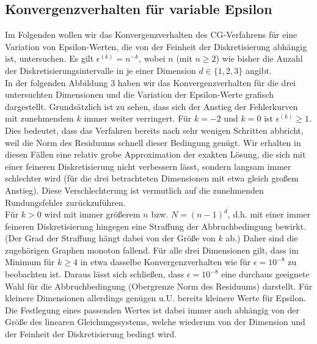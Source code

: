 \documentclass{scrartcl}
\begin{document}
\subsection{Konvergenzverhalten für variable Epsilon}
Im Folgenden wollen wir das Konvergenzverhalten des CG-Verfahrens für eine Variation von Epsilon-Werten, die von der Feinheit der Diskretisierung abhängig ist, untersuchen.
Es gilt $\epsilon^{(k)}=n^{-k}$, wobei $n$ (mit $n \geq 2$) wie bisher die Anzahl der Diskretisierungsintervalle in je einer Dimension $d\in\{1, 2, 3\}$ angibt. \\
In der folgenden Abbildung 3 haben wir das Konvergenzverhalten für die drei untersuchten Dimensionen und die Variation der Epsilon-Werte grafisch dargestellt.
Grundsätzlich ist zu sehen, dass sich der Anstieg der Fehlerkurven mit zunehmendem $k$ immer weiter verringert.
Für $k=-2$ und $k=0$ ist $\epsilon^{(k)}\geq 1$.
Dies bedeutet, dass das Verfahren bereits nach sehr wenigen Schritten abbricht, weil die Norm des Residuums schnell dieser Bedingung genügt.
Wir erhalten in diesen Fällen eine relativ grobe Approximation der exakten Lösung, die sich mit einer feineren Diskretisierung nicht verbessern lässt, sondern langsam immer schlechter wird (für die drei betrachteten Dimensionen mit etwa gleich großem Anstieg).
Diese Verschlechterung ist vermutlich auf die zunehmenden Rundungsfehler zurückzuführen. \\
Für $k>0$ wird mit immer größerem $n$ bzw. $N=(n-1)^d$, d.h. mit einer immer feineren Diskretisierung hingegen eine Straffung der Abbruchbedingung bewirkt.
(Der Grad der Straffung hängt dabei von der Größe von $k$ ab.)
Daher sind die zugehörigen Graphen monoton fallend.
Für alle drei Dimensionen gilt, dass im Minimum für $k\geq4$ in etwa dasselbe Konvergenzverhalten wie für $\epsilon = 10^{-8}$ zu beobachten ist.
Daraus lässt sich schließen, dass $\epsilon = 10^{-8}$ eine durchaus geeignete Wahl für die Abbruchbedingung (Obergrenze Norm des Residuums) darstellt.
Für kleinere Dimensionen allerdings genügen u.U. bereits kleinere Werte für Epsilon.
Die Festlegung eines passenden Wertes ist dabei immer auch abhängig von der Größe des linearen Gleichungssystems, welche wiederum von der Dimension und der Feinheit der Diskretisierung bedingt wird. \\
\end{document}

